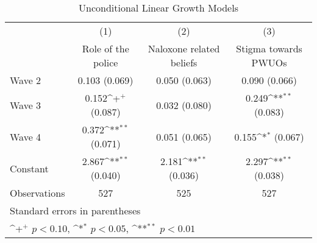 \begin{table}[htbp]\centering
\def\sym#1{\ifmmode^{#1}\else\(^{#1}\)\fi}
\caption{\centering Unconditional Linear Growth Models}
\begin{tabular}{l*{3}{c}}
\toprule
                &\multicolumn{1}{c}{(1)}&\multicolumn{1}{c}{(2)}&\multicolumn{1}{c}{(3)}\\
                &\multicolumn{1}{c}{Role of the police}&\multicolumn{1}{c}{Naloxone related beliefs}&\multicolumn{1}{c}{Stigma towards PWUOs}\\
\midrule
Wave 2          &0.103 (0.069)        &0.050 (0.063)        &0.090 (0.066)        \\
\addlinespace
Wave 3          &0.152\sym{+} (0.087)        &0.032 (0.080)        &0.249\sym{**} (0.083)        \\
\addlinespace
Wave 4          &0.372\sym{**} (0.071)        &0.051 (0.065)        &0.155\sym{*} (0.067)        \\
\addlinespace
Constant        &2.867\sym{**} (0.040)        &2.181\sym{**} (0.036)        &2.297\sym{**} (0.038)        \\
\midrule
Observations    &      527        &      525        &      527        \\
\bottomrule
\multicolumn{4}{l}{\footnotesize Standard errors in parentheses}\\
\multicolumn{4}{l}{\footnotesize \sym{+} \(p<0.10\), \sym{*} \(p<0.05\), \sym{**} \(p<0.01\)}\\
\end{tabular}
\end{table}
